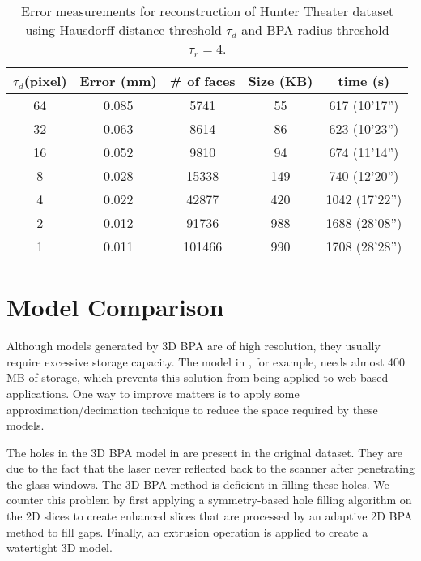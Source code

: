 \setlength{\tabcolsep}{4pt}
\begin{table}[hbtp]
\begin{center}
\begin{tabular}[t]{||c||c|c|c|c||}
\hline
$\tau_{d} $(pixel) & Error (mm)& \# of faces & Size (KB) & time (s) \\ \hline \hline
64 & 0.085 & 5741   & 55  & 617  (10'17'') \\ \hline
32 & 0.063 & 8614   & 86  & 623  (10'23'') \\ \hline  %
16 & 0.052 & 9810   & 94  & 674  (11'14'') \\ \hline
8  & 0.028 & 15338  & 149 & 740  (12'20'') \\ \hline
4  & 0.022 & 42877  & 420 & 1042 (17'22'') \\ \hline
2  & 0.012 & 91736  & 988 & 1688 (28'08'') \\ \hline %
1  & 0.011 & 101466 & 990 & 1708 (28'28'') \\ \hline
\end{tabular}
\end{center}
\caption{Error measurements for reconstruction of Hunter Theater dataset using
Hausdorff distance threshold $\tau_d$ and BPA radius threshold $\tau_r = 4$.}
\label{tbl:em_theater}
\end{table}
\setlength{\tabcolsep}{1.4pt}

\section{Model Comparison}

Although models generated by 3D BPA are of high resolution, they usually
require excessive storage capacity.
The model in , for example, needs almost 400 MB of storage,
which prevents this solution from being applied to web-based applications.
One way to improve matters is to apply some approximation/decimation
technique to reduce the space required by these models.

The holes in the 3D BPA model in  are present in the
original dataset.
They are due to the fact that the laser never reflected back to
the scanner after penetrating the glass windows.
The 3D BPA method is deficient in filling these holes.
We counter this problem by first applying a symmetry-based hole filling
algorithm on the 2D slices to create enhanced slices that are processed
by an adaptive 2D BPA method to fill gaps.
Finally, an extrusion operation is applied to create a watertight 3D model.

